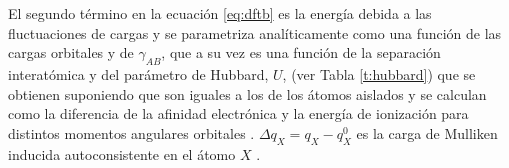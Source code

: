 \begin{table}[h!]
    \centering
    \caption{Configuraciones electrónicas, energías en el sitio de los orbitales
    de valencia y parámetros de Hubbard calculados con el funcional de intercambio
    y correlación PBE.}
    \setlength\extrarowheight{2pt}
    \label{t:hubbard}
\end{table}
El segundo término en la ecuación \ref{eq:dftb} es la energía debida a las 
fluctuaciones de cargas y se parametriza analíticamente como una función de las
cargas orbitales y de $\gamma_{AB}$, que a su vez es una función de la separación 
interatómica y del parámetro de Hubbard, $U$, (ver Tabla \ref{t:hubbard}) que se 
obtienen suponiendo que son iguales a los de los átomos aislados y se calculan
como la diferencia de la afinidad electrónica y la energía de ionización para 
distintos momentos angulares orbitales \cite{elstner1998b}. 
$\Delta q_X = q_X - q_X^0$ es la carga de Mulliken inducida autoconsistente en el 
átomo $X$ \cite{elstner1998}.

